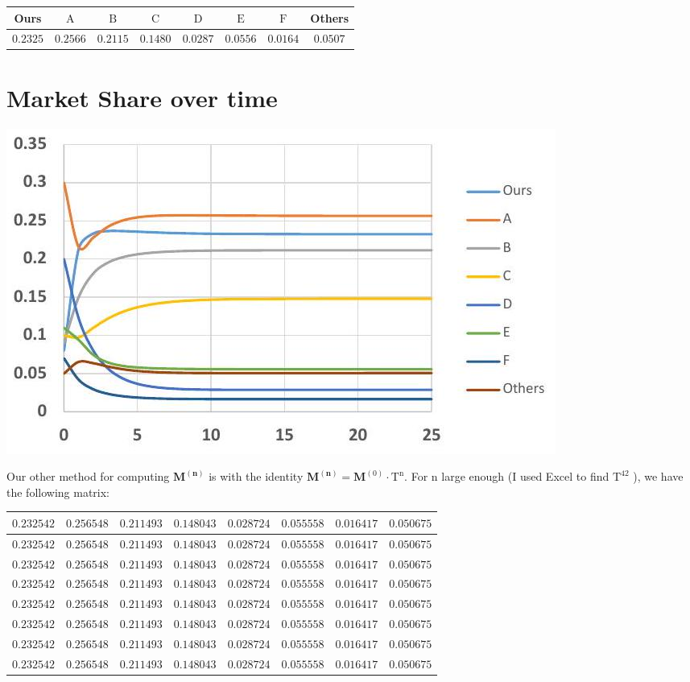 \documentclass[10pt]{article}
\begin{document}
\begin{tabular}{|c|c|c|c|c|c|c|c|}
\hline
Ours & $\mathrm{A}$ & $\mathrm{B}$ & $\mathrm{C}$ & $\mathrm{D}$ & $\mathrm{E}$ & $\mathrm{F}$ & Others \\
\hline
$0.2325$ & $0.2566$ & $0.2115$ & $0.1480$ & $0.0287$ & $0.0556$ & $0.0164$ & $0.0507$ \\
\hline
\end{tabular}

\section{Market Share over time}
\includegraphics[max width=\textwidth]{2022_07_05_5945264bba2a5f6ba667g-75(1)}

Our other method for computing $\mathbf{M}^{(\mathbf{n})}$ is with the identity $\mathbf{M}^{(\mathbf{n})}=\mathbf{M}^{(0)} \cdot \mathrm{T}^{\mathrm{n}}$. For $\mathrm{n}$ large enough (I used Excel to find $\mathrm{T}^{42}$ ), we have the following matrix:

\begin{tabular}{|l|l|l|l|l|l|l|l|}
\hline
$0.232542$ & $0.256548$ & $0.211493$ & $0.148043$ & $0.028724$ & $0.055558$ & $0.016417$ & $0.050675$ \\
\hline
$0.232542$ & $0.256548$ & $0.211493$ & $0.148043$ & $0.028724$ & $0.055558$ & $0.016417$ & $0.050675$ \\
\hline
$0.232542$ & $0.256548$ & $0.211493$ & $0.148043$ & $0.028724$ & $0.055558$ & $0.016417$ & $0.050675$ \\
\hline
$0.232542$ & $0.256548$ & $0.211493$ & $0.148043$ & $0.028724$ & $0.055558$ & $0.016417$ & $0.050675$ \\
\hline
$0.232542$ & $0.256548$ & $0.211493$ & $0.148043$ & $0.028724$ & $0.055558$ & $0.016417$ & $0.050675$ \\
\hline
$0.232542$ & $0.256548$ & $0.211493$ & $0.148043$ & $0.028724$ & $0.055558$ & $0.016417$ & $0.050675$ \\
\hline
$0.232542$ & $0.256548$ & $0.211493$ & $0.148043$ & $0.028724$ & $0.055558$ & $0.016417$ & $0.050675$ \\
\hline
$0.232542$ & $0.256548$ & $0.211493$ & $0.148043$ & $0.028724$ & $0.055558$ & $0.016417$ & $0.050675$ \\
\hline\hline
\end{tabular}
\end{document}
